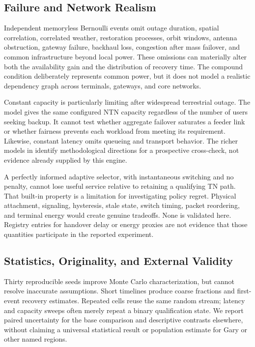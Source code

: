 \documentclass[10pt,twocolumn]{article}
\begin{document}
\subsection{Failure and Network Realism}
Independent memoryless Bernoulli events omit outage duration, spatial correlation, correlated weather, restoration processes, orbit windows, antenna obstruction, gateway failure, backhaul loss, congestion after mass failover, and common infrastructure beyond local power. These omissions can materially alter both the availability gain and the distribution of recovery time. The compound condition deliberately represents common power, but it does not model a realistic dependency graph across terminals, gateways, and core networks.

Constant capacity is particularly limiting after widespread terrestrial outage. The model gives the same configured NTN capacity regardless of the number of users seeking backup. It cannot test whether aggregate failover saturates a feeder link or whether fairness prevents each workload from meeting its requirement. Likewise, constant latency omits queueing and transport behavior. The richer models in \cite{wang2026,figaro2026} identify methodological directions for a prospective cross-check, not evidence already supplied by this engine.

A perfectly informed adaptive selector, with instantaneous switching and no penalty, cannot lose useful service relative to retaining a qualifying TN path. That built-in property is a limitation for investigating policy regret. Physical attachment, signaling, hysteresis, stale state, switch timing, packet reordering, and terminal energy would create genuine tradeoffs. None is validated here. Registry entries for handover delay or energy proxies are not evidence that those quantities participate in the reported experiment.

\subsection{Statistics, Originality, and External Validity}
Thirty reproducible seeds improve Monte Carlo characterization, but cannot resolve inaccurate assumptions. Short timelines produce coarse fractions and first-event recovery estimates. Repeated cells reuse the same random stream; latency and capacity sweeps often merely repeat a binary qualification state. We report paired uncertainty for the base comparison and descriptive contrasts elsewhere, without claiming a universal statistical result or population estimate for Gary or other named regions.
\end{document}
